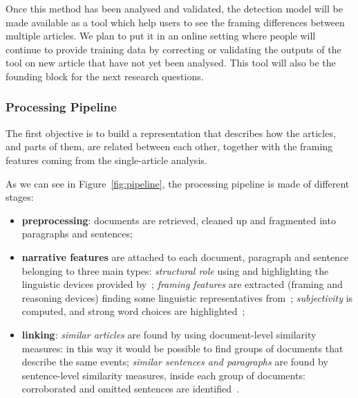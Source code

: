 Once this method has been analysed and validated, the detection model will be made available as a tool which help users to see the framing differences between multiple articles.
We plan to put it in an online setting where people will continue to provide training data by correcting or validating the outputs of the tool on new article that have not yet been analysed.
This tool will also be the founding block for the next research questions.

\subsubsection{Processing Pipeline}
\label{sec:prop_pipeline}
The first objective is to build a representation that describes how the articles, and parts of them, are related between each other, together with the framing features coming from the single-article analysis.




As we can see in Figure~\ref{fig:pipeline}, the processing pipeline is made of different stages:
\begin{itemize}
    \item \textbf{preprocessing}: documents are retrieved, cleaned up and fragmented into paragraphs and sentences;
    \item \textbf{narrative features} are attached to each document, paragraph and sentence belonging to three main types:
    \emph{structural role} using and highlighting the linguistic devices provided by~\cite{zahid2019towards};
    \emph{framing features} are extracted (framing and reasoning devices) finding some linguistic representatives from~\cite{gamson1989media,fillmore2006frame};
    \emph{subjectivity} is computed, and strong word choices are highlighted~\cite{liu2010sentiment};
    \item \textbf{linking}: \emph{similar articles} are found by using document-level similarity measures: in this way it would be possible to find groups of documents that describe the same events; \emph{similar sentences and paragraphs} are found by sentence-level similarity measures, inside each group of documents: corroborated and omitted sentences are identified~\cite{bountouridis2018explaining}.
\end{itemize}

